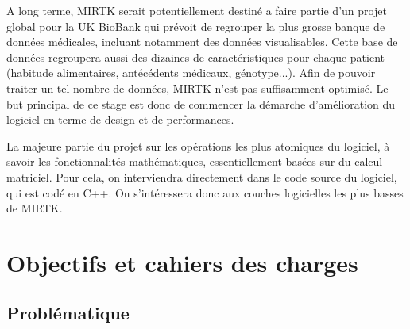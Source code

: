 \documentclass[10pt]{report}
\begin{document}
	 A long terme, MIRTK serait potentiellement destiné a faire partie d'un projet global pour la UK BioBank qui prévoit de regrouper la plus grosse banque de données médicales, incluant notamment des données visualisables. Cette base de données regroupera aussi des dizaines de caractéristiques pour chaque patient (habitude alimentaires, antécédents médicaux, génotype...). Afin de pouvoir traiter un tel nombre de données, MIRTK n'est pas suffisamment optimisé. Le but principal de ce stage est donc de commencer la démarche d'amélioration du logiciel en terme de design et de performances.
	 
	 La majeure partie du projet sur les opérations les plus atomiques du logiciel, à savoir les fonctionnalités mathématiques, essentiellement basées sur du calcul matriciel. Pour cela, on interviendra directement dans le code source du logiciel, qui est codé en C++. On s'intéressera donc aux couches logicielles les plus basses de MIRTK.
\chapter{Objectifs et cahiers des charges}
	\section{Problématique} %
	
\end{document}
